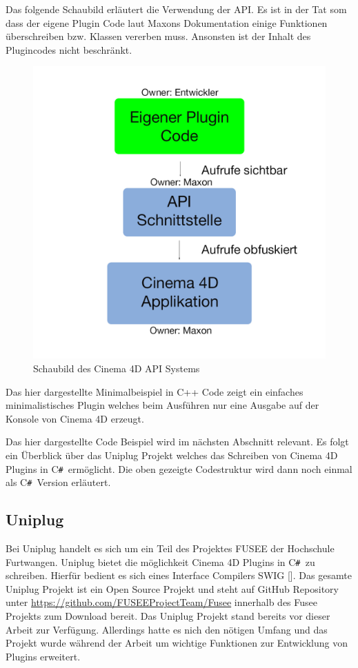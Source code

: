 \documentclass[pagesize, paper=a4, fontsize=12pt,titlepage=true, headings=small, headnosepline, abstractoff, liststotoc, nochapterprefix, plainheadsepline, twoside]{scrreprt}
\newcommand{\CSS}{C\texttt{\# }}
\begin{document}
Das folgende Schaubild erläutert die Verwendung der API. Es ist in der Tat som dass der eigene Plugin Code laut Maxons Dokumentation einige Funktionen überschreiben bzw. Klassen vererben muss. Ansonsten ist der Inhalt des Plugincodes nicht beschränkt. 
\newpage
\begin{figure}[ht]
	\centering
  \includegraphics[width=\linewidth]{Bilder/C4D_Api_Schaubild_v1.jpg}
	\caption{Schaubild des Cinema 4D API Systems}
	\label{C4D API Schaubild}
\end{figure}

Das hier dargestellte Minimalbeispiel in C++ Code zeigt ein einfaches minimalistisches Plugin welches beim Ausführen nur eine Ausgabe auf der Konsole von Cinema 4D erzeugt.

\newpage


Das hier dargestellte Code Beispiel wird im nächsten Abschnitt relevant. Es folgt ein Überblick über das Uniplug Projekt welches das Schreiben von Cinema 4D Plugins in \CSS ermöglicht. Die oben gezeigte  Codestruktur wird dann noch einmal als \CSS Version erläutert.

\subsection{Uniplug}
Bei Uniplug handelt es sich um ein Teil des Projektes FUSEE der Hochschule Furtwangen. Uniplug bietet die möglichkeit Cinema 4D Plugins in \CSS zu schreiben. Hierfür bedient es sich eines Interface Compilers SWIG []. Das gesamte Uniplug Projekt ist ein Open Source Projekt und steht auf GitHub Repository unter \url{https://github.com/FUSEEProjectTeam/Fusee} innerhalb des Fusee Projekts zum Download bereit. Das Uniplug Projekt stand bereits vor dieser Arbeit zur Verfügung. Allerdings hatte es nich den nötigen Umfang und das Projekt wurde während der Arbeit um wichtige Funktionen zur Entwicklung von Plugins erweitert.
\end{document}
